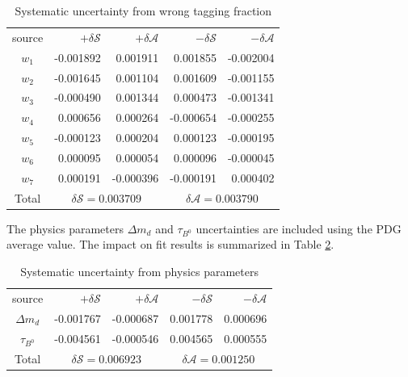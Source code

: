 \begin{table}[htpb]
	\begin{minipage}[b]{1.0\linewidth}
		\centering
		\caption{Systematic uncertainty from wrong tagging fraction}
		\label{tab:sy_wtag}
		\begin{tabular}{c r r r r}
			\hline
			source & $+\delta \mathcal{S}$ & $+\delta \mathcal{A}$ & $-\delta \mathcal{S}$ &  $-\delta \mathcal{A}$\\
			$w_1$ & -0.001892
			& 0.001911
			& 0.001855
			& -0.002004
			\\
			$ w_2$ & -0.001645
			& 0.001104
			& 0.001609
			& -0.001155
			\\
			$ w_3$ & -0.000490
			& 0.001344
			& 0.000473
			& -0.001341
			\\
			$ w_4$ & 0.000656
			& 0.000264
			& -0.000654
			& -0.000255 \\
			$ w_5$ & -0.000123
			& 0.000204
			& 0.000123 &
			-0.000195
			\\
			$ w_6$ & 0.000095 & 0.000054 & 0.000096 & -0.000045 \\
			$ w_7$ & 0.000191
			& -0.000396
			& -0.000191
			& 0.000402
			\\
			\hline
			Total &
			\multicolumn{2}{c}{$\delta \mathcal{S}=0.003709$} &
			\multicolumn{2}{c}{$\delta \mathcal{A}=0.003790$}\\
			\hline
		\end{tabular}
	\end{minipage}
\end{table}
The physics parameters $\Delta m_d$ and $\tau_{B^0}$ uncertainties are included using the PDG average value. The impact on fit results is summarized in Table \ref{tab:sy_phys}.
\begin{table}[htpb]
	\begin{minipage}[b]{1.0\linewidth}
		\centering
		\caption{Systematic uncertainty from  physics parameters}
		\label{tab:sy_phys}
		\begin{tabular}{c r r r r}
			\hline
			source & $+\delta \mathcal{S}$ & $+\delta \mathcal{A}$ & $-\delta \mathcal{S}$ &  $-\delta \mathcal{A}$\\
			$\Delta m_d$  & -0.001767
			& -0.000687
			& 0.001778
			& 0.000696
			\\
			$\tau_{B^0}$  & -0.004561
			& -0.000546
			& 0.004565
			& 0.000555
			\\
			\hline
			Total &
			\multicolumn{2}{c}{$\delta \mathcal{S}=0.006923$} &
			\multicolumn{2}{c}{$\delta \mathcal{A}=0.001250$}\\
			\hline
		\end{tabular}
	\end{minipage}
\end{table}
